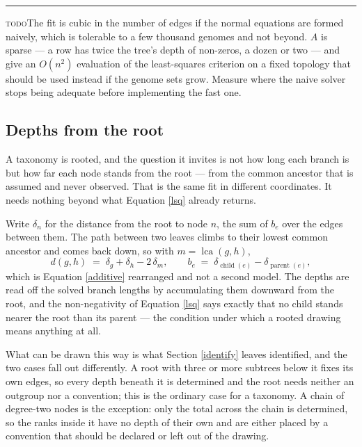 \documentclass[pdflatex,sn-vancouver-num]{sn-jnl}
\newif\ifshowtodos \showtodostrue
\newcommand{\todo}[1]{%
  \ifshowtodos
    \par\addvspace{0.7\baselineskip}%
    \begin{list}{}{%
      \setlength{\leftmargin}{1.5em}%
      \setlength{\rightmargin}{1.5em}%
      \setlength{\topsep}{0pt}%
      \setlength{\partopsep}{0pt}%
      \setlength{\parsep}{0.5\baselineskip}%
      \setlength{\itemsep}{0pt}%
    }%
    \item[]\footnotesize\color{black!70}%
      \textcolor{orange!65!black}{\rule[-0.2ex]{2pt}{1.15ex}}\hspace{0.55em}%
      \textcolor{orange!65!black}{\textsc{todo}}\hspace{0.6em}\ignorespaces#1%
    \end{list}%
    \addvspace{0.7\baselineskip}%
  \fi%
}
\begin{document}
\todo{The fit is cubic in the number of edges if the normal equations are formed naively, which is
tolerable to a few thousand genomes and not beyond. $A$ is sparse --- a row has twice the tree's
depth of non-zeros, a dozen or two --- and \cite{bryant1998structure} give an $O(n^2)$ evaluation of
the least-squares criterion on a fixed topology that should be used instead if the genome sets grow.
Measure where the naive solver stops being adequate before implementing the fast one.}

\subsection{Depths from the root}\label{depths}

A taxonomy is rooted, and the question it invites is not how long each branch is but how far each
node stands from the root --- from the common ancestor that is assumed and never observed. That is
the same fit in different coordinates. It needs nothing beyond what Equation \eqref{lsq} already
returns.

Write $\delta_n$ for the distance from the root to node $n$, the sum of $b_e$ over the edges between
them. The path between two leaves climbs to their lowest common ancestor and comes back down, so with
$m = \operatorname{lca}(g,h)$,
%
\begin{equation}
  d(g,h) \;=\; \delta_g + \delta_h - 2\,\delta_{m} ,
  \qquad
  b_e \;=\; \delta_{\operatorname{child}(e)} - \delta_{\operatorname{parent}(e)} ,
  \label{depthform}
\end{equation}
%
which is Equation \eqref{additive} rearranged and not a second model. The depths are read off the
solved branch lengths by accumulating them downward from the root, and the non-negativity of Equation
\eqref{lsq} says exactly that no child stands nearer the root than its parent --- the condition under
which a rooted drawing means anything at all.

What can be drawn this way is what Section \ref{identify} leaves identified, and the two cases fall
out differently. A root with three or more subtrees below it fixes its own edges, so every depth beneath
it is determined and the root needs neither an outgroup nor a convention; this is the ordinary case
for a taxonomy. A chain of degree-two nodes is the exception: only the total across the chain is
determined, so the ranks inside it have no depth of their own and are either placed by a convention
that should be declared or left out of the drawing.
\end{document}
